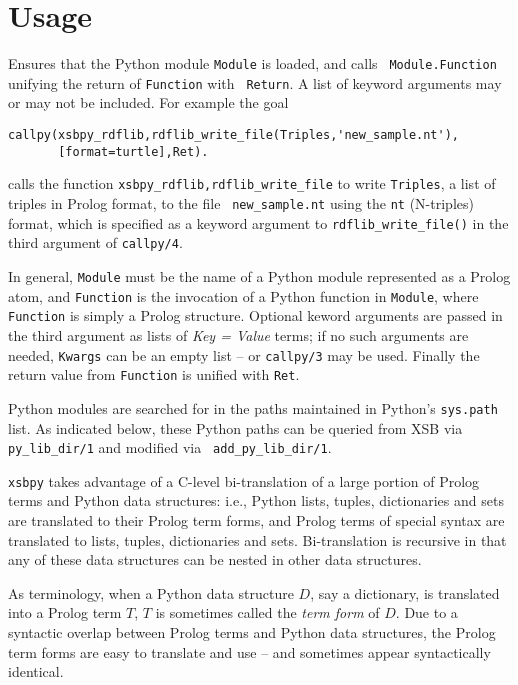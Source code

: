 \section{Usage}

\begin{description}

%
 Ensures that the Python module {\tt Module} is loaded, and calls {\tt
   Module.Function} unifying the return of {\tt Function} with {\tt
   Return}.  A list of keyword arguments may or may not be included.
 For example the goal

\begin{verbatim}
callpy(xsbpy_rdflib,rdflib_write_file(Triples,'new_sample.nt'),
       [format=turtle],Ret).
\end{verbatim}

calls the function {\tt xsbpy\_rdflib,rdflib\_write\_file} to write
{\tt Triples}, a list of triples in Prolog format, to the file {\tt
  new\_sample.nt} using the {\tt nt} (N-triples) format, which is
specified as a keyword argument to {\tt rdflib\_write\_file()} in the
third argument of {\tt callpy/4}.

In general, {\tt Module} must be the name of a Python module
represented as a Prolog atom, and {\tt Function} is the invocation of
a Python function in {\tt Module}, where {\tt Function} is simply a
Prolog structure.  Optional keword arguments are passed in the third
argument as lists of {\em Key = Value} terms; if no such arguments
are needed, {\tt Kwargs} can be an empty list -- or {\tt callpy/3} may
be used.  Finally the return value from {\tt Function} is unified with
{\tt Ret}.

Python modules are searched for in the paths maintained in Python's
{\tt sys.path} list.  As indicated below, these Python paths can be
queried from XSB via {\tt py\_lib\_dir/1} and modified via {\tt
  add\_py\_lib\_dir/1}.
     
{\tt xsbpy} takes advantage of a C-level bi-translation of a large
portion of Prolog terms and Python data structures: i.e., Python
lists, tuples, dictionaries and sets are translated to their Prolog
term forms, and Prolog terms of special syntax are translated to
lists, tuples, dictionaries and sets.  Bi-translation is recursive in
that any of these data structures can be nested in other data
structures.  
     
As terminology, when a Python data structure $D$, say a dictionary, is
translated into a Prolog term $T$, $T$ is sometimes called the {\em
  term form} of $D$.  Due to a syntactic overlap between Prolog terms
and Python data structures, the Prolog term forms are easy to
translate and use -- and sometimes appear syntactically identical.


\end{description}

